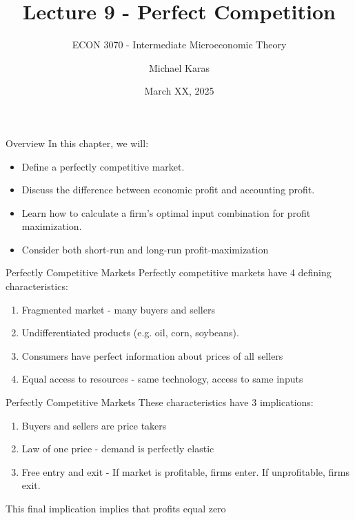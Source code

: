 \documentclass[11pt,t]{beamer}
\author{Michael Karas}
\title{Lecture 9 - Perfect Competition}
\subtitle{ECON 3070 - Intermediate Microeconomic Theory}
\date{March XX, 2025}
\begin{document}
\begin{frame}
  \titlepage
\end{frame}

\begin{frame}{Overview}
  In this chapter, we will:

  \begin{itemize}
    \item Define a perfectly competitive market.
    
    \item Discuss the difference between economic profit and accounting profit.
    
    \item Learn how to calculate a firm's optimal input combination for profit maximization.
    
    \item Consider both short-run and long-run profit-maximization
  \end{itemize}
\end{frame}

\begin{frame}{Perfectly Competitive Markets}
  Perfectly competitive markets have 4 defining characteristics:

  \begin{enumerate}
    \item Fragmented market - many buyers and sellers
    
    \item Undifferentiated products (e.g. oil, corn, soybeans).
    
    \item Consumers have perfect information about prices of all sellers
    
    \item Equal access to resources - same technology, access to same inputs
  \end{enumerate}
\end{frame}

\begin{frame}{Perfectly Competitive Markets}
  These characteristics have 3 implications:
  \bigskip

  \begin{enumerate}
    \item Buyers and sellers are price takers
    
    \item Law of one price - demand is perfectly elastic
    
    \item Free entry and exit - If market is profitable, firms enter. If unprofitable, firms exit.
  \end{enumerate}

  \bigskip
  This final implication implies that profits equal zero
\end{frame}
\end{document}

